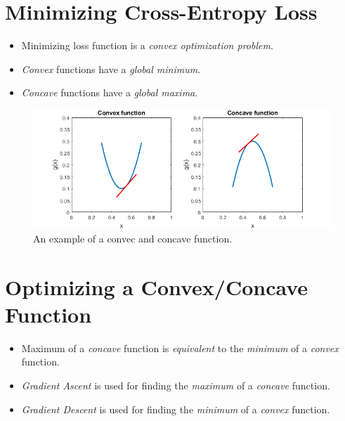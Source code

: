 \documentclass[
	number={4},
	title={Logistic Regression}
]{cs584notes}
\begin{document}
\section{Minimizing Cross-Entropy Loss}\label{sec:minimizing-cross-entropy-loss}
\begin{itemize}
	\item Minimizing loss function  is a \emph{convex optimization problem}.
	\item \emph{Convex} functions have a \emph{global minimum}.
	\item \emph{Concave} functions have a \emph{global maxima}.
\end{itemize}

\begin{figure}[H]
	\centering
	\includegraphics[width=\textwidth]{figures/4/concave_convex}
	\caption{An example of a convec and concave function.}
	\label{fig:concave-convex}
\end{figure}


\section{Optimizing a Convex/Concave Function}\label{sec:optimizing-a-convex/concave-function}
\begin{itemize}
	\item Maximum of a \emph{concave} function is \emph{equivalent} to the \emph{minimum} of a \emph{convex} function.
	\item \emph{Gradient Ascent} is used for finding the \emph{maximum} of a \emph{concave} function.
	\item \emph{Gradient Descent} is used for finding the \emph{minimum} of a \emph{convex} function.
\end{itemize}
\end{document}
